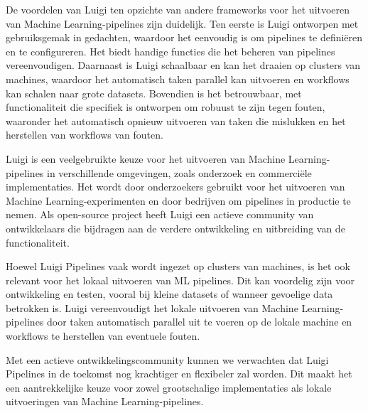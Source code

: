 De voordelen van Luigi ten opzichte van andere frameworks voor het uitvoeren van Machine Learning-pipelines zijn duidelijk. Ten eerste is Luigi ontworpen met gebruiksgemak in gedachten, waardoor het eenvoudig is om pipelines te definiëren en te configureren. Het biedt handige functies die het beheren van pipelines vereenvoudigen. Daarnaast is Luigi schaalbaar en kan het draaien op clusters van machines, waardoor het automatisch taken parallel kan uitvoeren en workflows kan schalen naar grote datasets. Bovendien is het betrouwbaar, met functionaliteit die specifiek is ontworpen om robuust te zijn tegen fouten, waaronder het automatisch opnieuw uitvoeren van taken die mislukken en het herstellen van workflows van fouten.

Luigi is een veelgebruikte keuze voor het uitvoeren van Machine Learning-pipelines in verschillende omgevingen, zoals onderzoek en commerciële implementaties. Het wordt door onderzoekers gebruikt voor het uitvoeren van Machine Learning-experimenten en door bedrijven om pipelines in productie te nemen. Als open-source project heeft Luigi een actieve community van ontwikkelaars die bijdragen aan de verdere ontwikkeling en uitbreiding van de functionaliteit.

Hoewel Luigi Pipelines vaak wordt ingezet op clusters van machines, is het ook relevant voor het lokaal uitvoeren van ML pipelines. Dit kan voordelig zijn voor ontwikkeling en testen, vooral bij kleine datasets of wanneer gevoelige data betrokken is. Luigi vereenvoudigt het lokale uitvoeren van Machine Learning-pipelines door taken automatisch parallel uit te voeren op de lokale machine en workflows te herstellen van eventuele fouten.

Met een actieve ontwikkelingscommunity kunnen we verwachten dat Luigi Pipelines in de toekomst nog krachtiger en flexibeler zal worden. Dit maakt het een aantrekkelijke keuze voor zowel grootschalige implementaties als lokale uitvoeringen van Machine Learning-pipelines.

